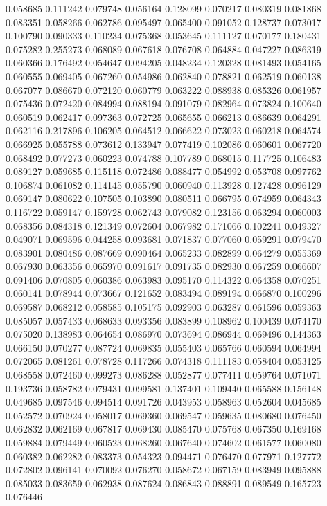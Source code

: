 0.058685
0.111242
0.079748
0.056164
0.128099
0.070217
0.080319
0.081868
0.083351
0.058266
0.062786
0.095497
0.065400
0.091052
0.128737
0.073017
0.100790
0.090333
0.110234
0.075368
0.053645
0.111127
0.070177
0.180431
0.075282
0.255273
0.068089
0.067618
0.076708
0.064884
0.047227
0.086319
0.060366
0.176492
0.054647
0.094205
0.048234
0.120328
0.081493
0.054165
0.060555
0.069405
0.067260
0.054986
0.062840
0.078821
0.062519
0.060138
0.067077
0.086670
0.072120
0.060779
0.063222
0.088938
0.085326
0.061957
0.075436
0.072420
0.084994
0.088194
0.091079
0.082964
0.073824
0.100640
0.060519
0.062417
0.097363
0.072725
0.065655
0.066213
0.086639
0.064291
0.062116
0.217896
0.106205
0.064512
0.066622
0.073023
0.060218
0.064574
0.066925
0.055788
0.073612
0.133947
0.077419
0.102086
0.060601
0.067720
0.068492
0.077273
0.060223
0.074788
0.107789
0.068015
0.117725
0.106483
0.089127
0.059685
0.115118
0.072486
0.088477
0.054992
0.053708
0.097762
0.106874
0.061082
0.114145
0.055790
0.060940
0.113928
0.127428
0.096129
0.069147
0.080622
0.107505
0.103890
0.080511
0.066795
0.074959
0.064343
0.116722
0.059147
0.159728
0.062743
0.079082
0.123156
0.063294
0.060003
0.068356
0.084318
0.121349
0.072604
0.067982
0.171066
0.102241
0.049327
0.049071
0.069596
0.044258
0.093681
0.071837
0.077060
0.059291
0.079470
0.083901
0.080486
0.087669
0.090464
0.065233
0.082899
0.064279
0.055369
0.067930
0.063356
0.065970
0.091617
0.091735
0.082930
0.067259
0.066607
0.091406
0.070805
0.060386
0.063983
0.095170
0.114322
0.064358
0.070251
0.060141
0.078944
0.073667
0.121652
0.083494
0.089194
0.066870
0.100296
0.069587
0.068212
0.058585
0.105175
0.092903
0.063287
0.061596
0.059363
0.085057
0.057433
0.068633
0.093356
0.083899
0.108962
0.100439
0.074170
0.075020
0.138983
0.064654
0.086970
0.073694
0.086944
0.069496
0.144363
0.066150
0.070277
0.087724
0.069835
0.055403
0.065766
0.060594
0.064994
0.072065
0.081261
0.078728
0.117266
0.074318
0.111183
0.058404
0.053125
0.068558
0.072460
0.099273
0.086288
0.052877
0.077411
0.059764
0.071071
0.193736
0.058782
0.079431
0.099581
0.137401
0.109440
0.065588
0.156148
0.049685
0.097546
0.094514
0.091726
0.043953
0.058963
0.052604
0.045685
0.052572
0.070924
0.058017
0.069360
0.069547
0.059635
0.080680
0.076450
0.062832
0.062169
0.067817
0.069430
0.085470
0.075768
0.067350
0.169168
0.059884
0.079449
0.060523
0.068260
0.067640
0.074602
0.061577
0.060080
0.060382
0.062282
0.083373
0.054323
0.094471
0.076470
0.077971
0.127772
0.072802
0.096141
0.070092
0.076270
0.058672
0.067159
0.083949
0.095888
0.085033
0.083659
0.062938
0.087624
0.086843
0.088891
0.089549
0.165723
0.076446
